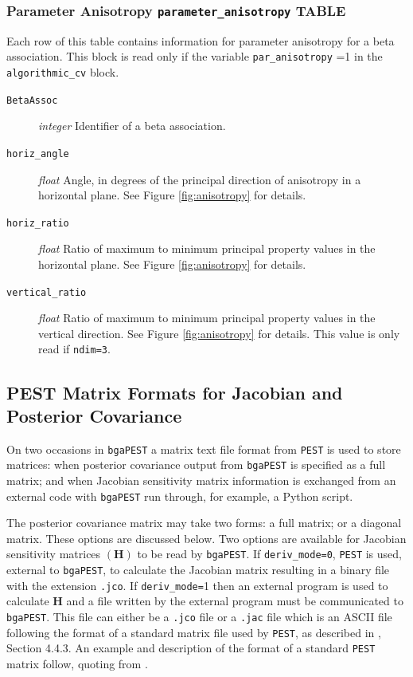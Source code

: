 \documentclass[11pt,oneside,onecolumn]{usgsreport}
\begin{document}
\begin{appendix}
\begin{bibunit}
\subsubsection{Parameter Anisotropy \texttt{parameter\_anisotropy} TABLE}

Each row of this table contains information for parameter anisotropy
for a beta association. This block is read only if the variable \texttt{par\_anisotropy}
=1 in the \texttt{algorithmic\_cv} block.
\begin{description}
\item [{\texttt{BetaAssoc}}] \emph{integer} Identifier of a beta association.
\item [{\texttt{horiz\_angle}}] \emph{float }Angle, in degrees of the principal
direction of anisotropy in a horizontal plane. See Figure \ref{fig:anisotropy}
for details.
\item [{\texttt{horiz\_ratio}}] \emph{float }Ratio of maximum to minimum
principal property values in the horizontal plane. See Figure \ref{fig:anisotropy}
for details.
\item [{\texttt{vertical\_ratio}}] \emph{float }Ratio of maximum to minimum
principal property values in the vertical direction. See Figure \ref{fig:anisotropy}
for details. This value is only read if \texttt{ndim=3}.
\end{description}

\subsection{PEST Matrix Formats for Jacobian and Posterior Covariance}

On two occasions in \texttt{bgaPEST} a matrix text file format from
\texttt{PEST} is used to store matrices: when posterior covariance
output from \texttt{bgaPEST} is specified as a full matrix; and when
Jacobian sensitivity matrix information is exchanged from an external
code with \texttt{bgaPEST} run through, for example, a Python script. 

The posterior covariance matrix may take two forms: a full matrix;
or a diagonal matrix. These options are discussed below. Two options
are available for Jacobian sensitivity matrices $\left(\mathbf{H}\right)$
to be read by \texttt{bgaPEST}. If \texttt{deriv\_mode=0}, \texttt{PEST}
is used, external to \texttt{bgaPEST}, to calculate the Jacobian matrix
resulting in a binary file with the extension \texttt{.jco}. If \texttt{deriv\_mode=}1
then an external program is used to calculate $\mathbf{H}$ and a
file written by the external program must be communicated to \texttt{bgaPEST}.
This file can either be a \texttt{.jco} file or a \texttt{.jac} file
which is an ASCII file following the format of a standard matrix file
used by \texttt{PEST}, as described in \citet{PESTAdd}, Section 4.4.3.
An example and description of the format of a standard \texttt{PEST}
matrix follow, quoting from \citet{PESTAdd}.


\end{bibunit}
\end{appendix}
\end{document}
